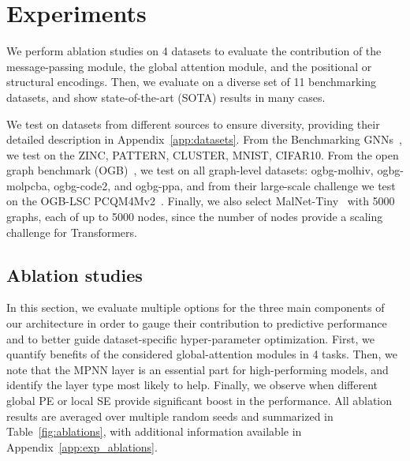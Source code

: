 \documentclass{article}
\begin{document}




\section{Experiments}
We perform ablation studies on 4 datasets to evaluate the contribution of the message-passing module, the global attention module, and the positional or structural encodings. Then, we evaluate \method on a diverse set of 11 benchmarking datasets, and show state-of-the-art (SOTA) results in many cases.


We test on datasets from different sources to ensure diversity, providing their detailed description in Appendix~\ref{app:datasets}. From the Benchmarking GNNs~\cite{dwivedi2020benchmarking}, we test on the ZINC, PATTERN, CLUSTER, MNIST, CIFAR10. From the open graph benchmark (OGB)~\cite{hu2020ogb}, we test on all graph-level datasets: ogbg-molhiv, ogbg-molpcba, ogbg-code2, and ogbg-ppa, and from their large-scale challenge we test on the OGB-LSC PCQM4Mv2~\cite{hu2021ogblsc}. Finally, we also select MalNet-Tiny~\cite{freitas2021malnet} with 5000 graphs, each of up to 5000 nodes, since the number of nodes provide a scaling challenge for Transformers.

\subsection{Ablation studies}\label{sec:ablations}
In this section, we evaluate multiple options for the three main components of our architecture in order to gauge their contribution to predictive performance and to better guide dataset-specific hyper-parameter optimization. First, we quantify benefits of the considered global-attention modules in 4 tasks. Then, we note that the MPNN layer is an essential part for high-performing models, and identify the layer type most likely to help. Finally, we observe when different global PE or local SE provide significant boost in the performance.
All ablation results are averaged over multiple random seeds and summarized in Table~\ref{fig:ablations}, with additional information available in Appendix~\ref{app:exp_ablations}.
\end{document}
